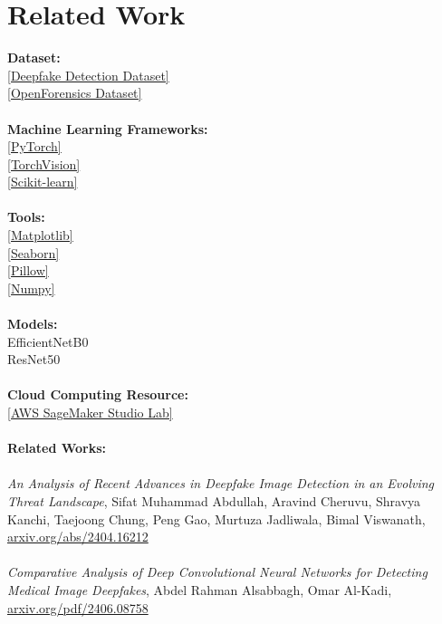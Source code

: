 \documentclass[conference]{IEEEtran}
\begin{document}
\section*{Related Work}
\textbf{Dataset:}  \\
\href{https://www.kaggle.com/datasets/manjilkarki/deepfake-and-real-images/data}{[Deepfake Detection Dataset]} \\
\href{https://zenodo.org/records/5528418\#.YpdlS2hBzDd}{[OpenForensics Dataset]} \\ \\
\textbf{Machine Learning Frameworks:} \\ 
\href{https://pytorch.org/}{[PyTorch]} \\
\href{https://pytorch.org/vision/stable/index.html}{[TorchVision]} \\
\href{https://scikit-learn.org/stable/}{[Scikit-learn]} \\ \\
\textbf{Tools:}  \\
\href{https://matplotlib.org/}{[Matplotlib]} \\
\href{https://seaborn.pydata.org/}{[Seaborn]} \\
\href{https://pillow.readthedocs.io/en/stable/}{[Pillow]} \\
\href{https://numpy.org/}{[Numpy]} \\ \\
\textbf{Models:}  \\
EfficientNetB0 \\
ResNet50 \\ \\
\textbf{Cloud Computing Resource:}  \\
\href{https://studiolab.sagemaker.aws/}{[AWS SageMaker Studio Lab]} \\ \\
\textbf{Related Works:}  \\ \\
\textit{An Analysis of Recent Advances in Deepfake Image Detection in an
Evolving Threat Landscape}, Sifat Muhammad Abdullah, Aravind Cheruvu, Shravya Kanchi, Taejoong Chung, Peng Gao, Murtuza Jadliwala, Bimal Viswanath, \href{https://arxiv.org/pdf/2404.16212}{arxiv.org/abs/2404.16212} \\ \\
\textit{Comparative Analysis of Deep Convolutional Neural Networks
for Detecting Medical Image Deepfakes}, Abdel Rahman Alsabbagh, Omar Al-Kadi, \href{https://arxiv.org/abs/2406.08758}{arxiv.org/pdf/2406.08758} \\ \\
\end{document}
